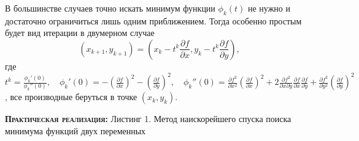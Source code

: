 \documentclass [12pt]{article}
\begin{document}
В большинстве случаев точно искать минимум функции $\phi_{k}(t)$ не нужно и достаточно ограничиться лишь одним приближением. Тогда особенно простым будет вид итерации в двумерном случае $$ (x_{k+1}, y_{k+1}) = (x_{k} - t^{k}\frac{\partial f}{\partial x} , y_{k} - t^{k}\frac{\partial f}{\partial y}) ,$$ где $t^{k} = \frac{\phi_{k}'(0)}{\phi_{k}''(0)}, \quad \phi_{k}'(0) = -(\frac{\partial f}{\partial x})^{2} - (\frac{\partial f}{\partial y})^{2}, \quad \phi_{k}''(0) = \frac{\partial f^{2}}{\partial x^{2}}(\frac{\partial f}{\partial x})^{2} + 2\frac{\partial f^{2}}{\partial x \partial y}\frac{\partial f}{\partial x}\frac{\partial f}{\partial y} + \frac{\partial f^{2}}{\partial y^{2}}(\frac{\partial f}{\partial y})^{2}$, все производные беруться в точке $(x_{k}, y_{k})$.

\textsc{\textbf{Практическая реализация:}}
Листинг 1. Метод наискорейшего спуска поиска минимума функций двух переменных
\end{document}
